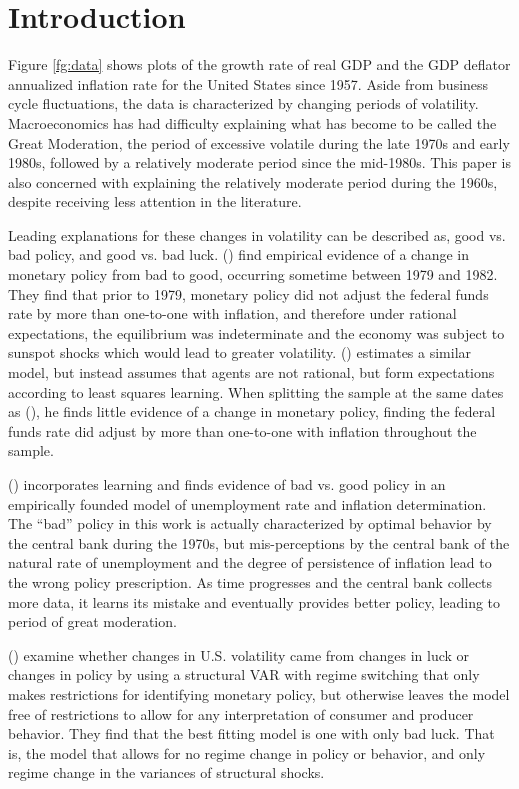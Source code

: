 \documentclass[12pt]{article}
\newcommand{\citee}[1]{\citename{#1} (\citeyear{#1})}
\begin{document}
\newpage
\section{Introduction}
Figure \ref{fg:data} shows plots of the growth rate of real GDP and the GDP deflator annualized inflation rate for the United States since 1957.  Aside from business cycle fluctuations, the data is characterized by changing periods of volatility.  Macroeconomics has had difficulty explaining what has become to be called the Great Moderation, the period of excessive volatile during the late 1970s and early 1980s, followed by a relatively moderate period since the mid-1980s.  This paper is also concerned with explaining the relatively moderate period during the 1960s, despite receiving less attention in the literature.

Leading explanations for these changes in volatility can be described as, good vs. bad policy, and good vs. bad luck.  \citee{ls2004} find empirical evidence of a change in monetary policy from bad to good, occurring sometime between 1979 and 1982.  They find that prior to 1979, monetary policy did not adjust the federal funds rate by more than one-to-one with inflation, and therefore under rational expectations, the equilibrium was indeterminate and the economy was subject to sunspot shocks which would lead to greater volatility.  \citee{milani2005} estimates a similar model, but instead assumes that agents are not rational, but form expectations according to least squares learning.  When splitting the sample at the same dates as \citee{ls2004}, he finds little evidence of a change in monetary policy, finding the federal funds rate did adjust by more than one-to-one with inflation throughout the sample.  

\citee{primiceri2005} incorporates learning and finds evidence of bad vs. good policy in an empirically founded model of unemployment rate and inflation determination.  The ``bad'' policy in this work is actually characterized by optimal behavior by the central bank during the 1970s, but mis-perceptions by the central bank of the natural rate of unemployment and the degree of persistence of inflation lead to the wrong policy prescription.  As time progresses and the central bank collects more data, it learns its mistake and eventually provides better policy, leading to period of great moderation.

\citee{simszha2006} examine whether changes in U.S. volatility came from changes in luck or changes in policy by using a structural VAR with regime switching that only makes restrictions for identifying monetary policy, but otherwise leaves the model free of restrictions to allow for any interpretation of consumer and producer behavior.  They find that the best fitting model is one with only bad luck.  That is, the model that allows for no regime change in policy or behavior, and only regime change in the variances of structural shocks.
\end{document}
